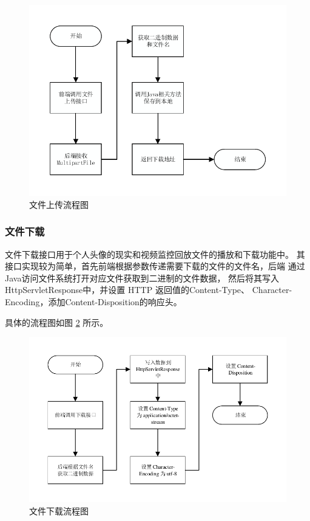 \begin{figure}[ht]
    \centering
    \includegraphics[width=1\linewidth]{./Figure/IMG_seq_upload.pdf}
    \caption{文件上传流程图}\label{Fig:seq_upload}
\end{figure}

\newpage
\subsubsection{文件下载}
文件下载接口用于个人头像的现实和视频监控回放文件的播放和下载功能中。
其接口实现较为简单，首先前端根据参数传递需要下载的文件的文件名，后端
通过Java访问文件系统打开对应文件获取到二进制的文件数据，
然后将其写入HttpServletResponse中，并设置 HTTP 返回值的Content-Type、
Character-Encoding，添加Content-Disposition的响应头。

具体的流程图如图 \ref{Fig:seq_download} 所示。

\begin{figure}[ht]
    \centering
    \includegraphics[width=1\linewidth]{./Figure/IMG_seq_download.pdf}
    \caption{文件下载流程图}\label{Fig:seq_download}
\end{figure}

